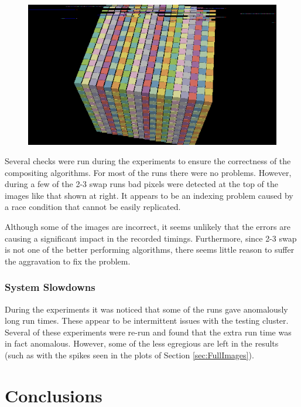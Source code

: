 \documentclass{vgtc}                          %
\newcommand{\textalgorithm}[1]{\textsf{#1}\xspace}
\newcommand{\ttswap}{\textalgorithm{2-3 swap}}
\begin{document}
\begin{figure}
  \includegraphics[width=\linewidth]{bad-composite-2-3-swap}
\end{figure}
Several checks were run during the experiments to ensure the correctness of the compositing algorithms.
For most of the runs there were no problems.
However, during a few of the \ttswap runs bad pixels were detected at the top of the images like that shown at right.
It appears to be an indexing problem caused by a race condition that cannot be easily replicated.

Although some of the images are incorrect, it seems unlikely that the errors are causing a significant impact in the recorded timings.
Furthermore, since \ttswap is not one of the better performing algorithms, there seems little reason to suffer the aggravation to fix the problem.

\subsubsection{System Slowdowns}

During the experiments it was noticed that some of the runs gave anomalously long run times.
These appear to be intermittent issues with the testing cluster.
Several of these experiments were re-run and found that the extra run time was in fact anomalous.
However, some of the less egregious are left in the results (such as with the spikes seen in the plots of Section \ref{sec:FullImages}).

\section{Conclusions}
\end{document}
